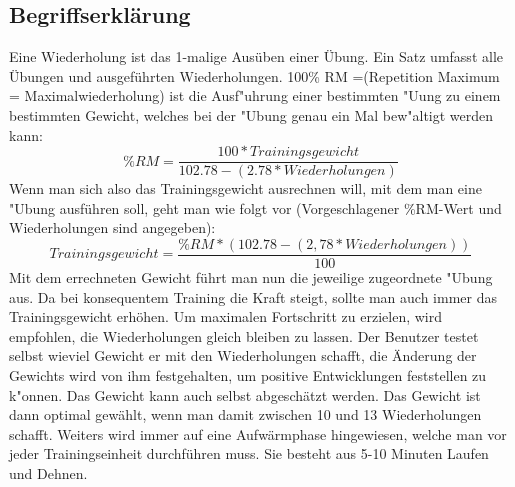\documentclass[FIPLY_base.tex]{subfiles}
\begin{document}
	\subsection{Begriffserklärung}
	Eine \grqq{}Wiederholung\grqq{} ist das 1-malige Ausüben einer Übung. 
	\newline
	Ein \grqq{}Satz\grqq{} umfasst alle Übungen und ausgeführten Wiederholungen.
	100\% RM =(Repetition Maximum = Maximalwiederholung) ist die Ausf"uhrung einer bestimmten "Uung zu einem bestimmten Gewicht, welches bei der "Ubung genau ein Mal bew"altigt werden kann:
	\[\%RM=\frac{100*Trainingsgewicht}{102.78-(2.78*Wiederholungen)}\]
	Wenn man sich also das Trainingsgewicht ausrechnen will, mit dem man eine "Ubung ausführen soll, geht man wie folgt vor (Vorgeschlagener \%RM-Wert und Wiederholungen sind angegeben):
	\[Trainingsgewicht=\frac{\%RM*(102.78-(2,78*Wiederholungen))}{100}\]
	Mit dem errechneten Gewicht führt man nun die jeweilige zugeordnete "Ubung aus. Da  bei konsequentem Training die Kraft steigt, sollte man auch immer das Trainingsgewicht erhöhen. Um maximalen Fortschritt zu erzielen, wird empfohlen, die Wiederholungen gleich bleiben zu lassen. Der Benutzer testet selbst wieviel Gewicht er mit den Wiederholungen schafft, die Änderung der Gewichts wird von ihm festgehalten, um positive Entwicklungen feststellen zu k"onnen. 
	\newline
	Das Gewicht kann auch selbst abgeschätzt werden. Das Gewicht ist dann optimal gewählt, wenn man damit zwischen 10 und 13 Wiederholungen schafft.
	Weiters wird immer auf eine Aufwärmphase hingewiesen, welche man vor jeder Trainingseinheit durchführen muss. Sie besteht aus 5-10 Minuten Laufen und Dehnen.
	
\end{document}

